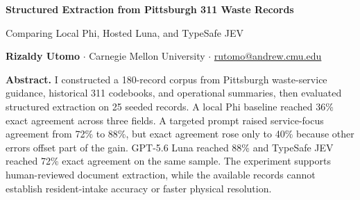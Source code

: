 \documentclass[9pt]{article}
\newcommand{\pct}[1]{#1\%}
\begin{document}
\begin{center}
{\fontsize{16}{17}\selectfont\bfseries\color{ink} Structured Extraction from Pittsburgh 311 Waste Records}\par
\vspace{2pt}
{\fontsize{10}{11}\selectfont Comparing Local Phi, Hosted Luna, and TypeSafe JEV}\par
\vspace{5pt}
{\bfseries Rizaldy Utomo} $\cdot$ Carnegie Mellon University $\cdot$
\href{mailto:rutomo@andrew.cmu.edu}{rutomo@andrew.cmu.edu}
\end{center}

\vspace{-2pt}
\noindent\colorbox{gray!9}{\parbox{0.965\textwidth}{\small
\textbf{Abstract.} I constructed a 180-record corpus from Pittsburgh waste-service guidance, historical 311 codebooks, and operational summaries, then evaluated structured extraction on 25 seeded records. A local Phi baseline reached \pct{36} exact agreement across three fields. A targeted prompt raised service-focus agreement from \pct{72} to \pct{88}, but exact agreement rose only to \pct{40} because other errors offset part of the gain. GPT-5.6 Luna reached \pct{88} and TypeSafe JEV reached \pct{72} exact agreement on the same sample. The experiment supports human-reviewed document extraction, while the available records cannot establish resident-intake accuracy or faster physical resolution.}}
\end{document}
